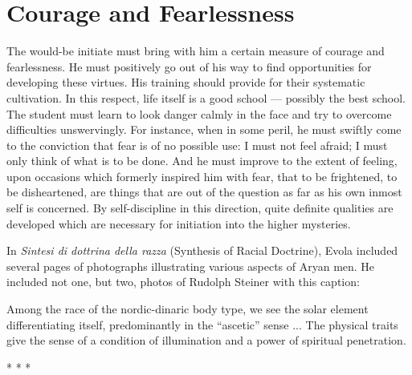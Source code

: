 \section{Courage and Fearlessness}

\begin{quotex}
The would-be initiate must bring with him a certain measure of courage and fearlessness. He must positively go out of his way to find opportunities for developing these virtues. His training should provide for their systematic cultivation. In this respect, life itself is a good school --- possibly the best school. The student must learn to look danger calmly in the face and try to overcome difficulties unswervingly. For instance, when in some peril, he must swiftly come to the conviction that fear is of no possible use: I must not feel afraid; I must only think of what is to be done. And he must improve to the extent of feeling, upon occasions which formerly inspired him with fear, that to be frightened, to be disheartened, are things that are out of the question as far as his own inmost self is concerned. By self-discipline in this direction, quite definite qualities are developed which are necessary for initiation into the higher mysteries.
\end{quotex}

In \textit{Sintesi di dottrina della razza} (Synthesis of Racial Doctrine), Evola included several pages of photographs illustrating various aspects of Aryan men. He included not one, but two, photos of Rudolph Steiner with this caption:

\begin{quotex}
Among the race of the nordic-dinaric body type, we see the solar element differentiating itself, predominantly in the ``ascetic'' sense ... The physical traits give the sense of a condition of illumination and a power of spiritual penetration.
\end{quotex}


\begin{center}* * *\end{center}

